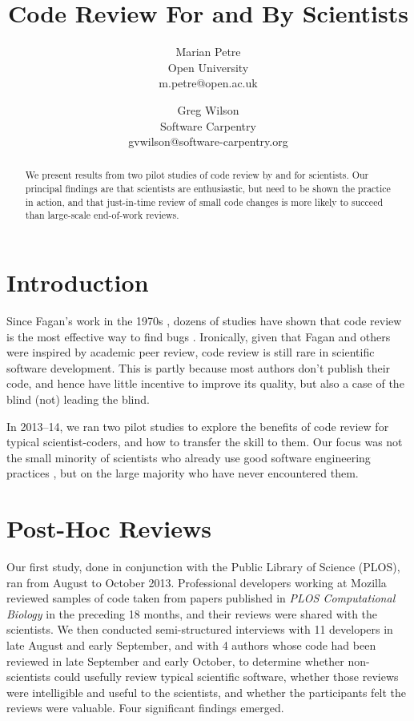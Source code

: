 \documentclass[10pt,twocolumn]{article}
\begin{document}
\title{Code Review For and By Scientists}
\author{
  Marian Petre \\ {\small Open University} \\ {\small m.petre@open.ac.uk}
  \and
  Greg Wilson \\ {\small Software Carpentry} \\ {\small gvwilson@software-carpentry.org}
}

\maketitle

\begin{abstract}

We present results from two pilot studies of code review by and for scientists.
Our principal findings are that scientists are enthusiastic,
but need to be shown the practice in action,
and that just-in-time review of small code changes is more likely to succeed
than large-scale end-of-work reviews.

\end{abstract}

\section{Introduction}

Since Fagan's work in the 1970s \cite{b:fagan1976,b:fagan1986},
dozens of studies have shown that code review is
the most effective way to find bugs \cite{b:cohen2010,b:bacchelli2013}.
Ironically,
given that Fagan and others were inspired by academic peer review,
code review is still rare in scientific software development.
This is partly because most authors don't publish their code,
and hence have little incentive to improve its quality,
but also a case of the blind (not) leading the blind.

In 2013--14,
we ran two pilot studies to explore the benefits of code review for typical scientist-coders,
and how to transfer the skill to them.
Our focus was not the small minority of scientists who already use good software engineering practices \cite{b:hannay2009},
but on the large majority who have never encountered them.

\section{Post-Hoc Reviews}

Our first study,
done in conjunction with the Public Library of Science (PLOS),
ran from August to October 2013.
Professional developers working at Mozilla reviewed samples of code
taken from papers published in \emph{PLOS Computational Biology} in the preceding 18 months,
and their reviews were shared with the scientists.
We then conducted semi-structured interviews \cite{b:rosenthal2007,b:bryman2008} with 11 developers in late August and early September,
and with 4 authors whose code had been reviewed in late September and early October,
to determine
whether non-scientists could usefully review typical scientific software,
whether those reviews were intelligible and useful to the scientists,
and whether the participants felt the reviews were valuable.
Four significant findings emerged.
\end{document}
